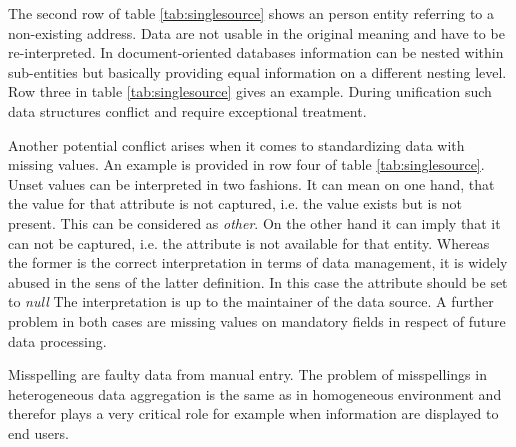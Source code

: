 The second row of table \ref{tab:singlesource} shows an person entity referring to a non-existing address. Data are not usable in the original meaning and have to be re-interpreted. In document-oriented databases information can be nested within sub-entities but basically providing equal information on a different nesting level. Row three in table \ref{tab:singlesource} gives an example. During unification such data structures conflict and require exceptional treatment. 

Another potential conflict arises when it comes to standardizing data with missing values. An example is provided in row four of table \ref{tab:singlesource}. Unset values can be interpreted in two fashions. It can mean on one hand, that the value for that attribute is not captured, i.e. the value exists but is not present. This can be considered as \textit{other}. On the other hand it can imply that it can not be captured, i.e. the attribute is not available for that entity. Whereas the former is the correct interpretation in terms of data management, it is widely abused in the sens of the latter definition. In this case the attribute should be set to \textit{null} The interpretation is up to the maintainer of the data source.  A further problem in both cases are missing values on mandatory fields in respect of future data processing.

Misspelling are faulty data from manual entry. The problem of misspellings in heterogeneous data aggregation is the same as in homogeneous environment and therefor plays a very critical role for example when information are displayed to end users.  

\begin{table}[htb]
\centering
{}
\caption{Examples of single source problems}
\label{tab:singlesource}
\end{table}

